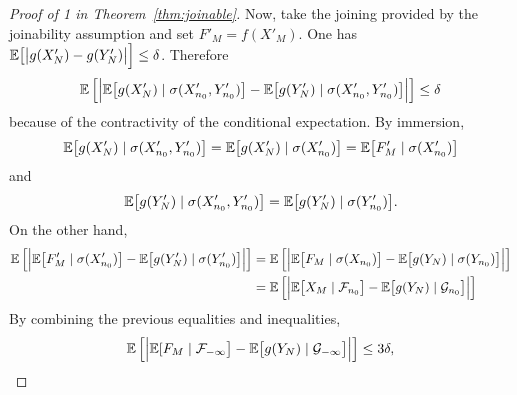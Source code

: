 \documentclass[12pt,a4paper]{article}
\begin{document}
\begin{proof}[Proof of 1 in Theorem~\ref{thm:joinable}]
Now, take the joining provided by the joinability assumption and set $F'_M=f(X'_M)$. 
One has $\mathbb{E}\bigl[\bigl|g(X'_N) - g(Y'_N)\bigr|\Bigr] \leq \delta$. Therefore 
$$
\mathbb{E}\left[ \Bigr|\mathbb{E}\bigl[g(X'_N) \mid \sigma(X'_{n_0}, Y'_{n_0})\bigr] 
 - \mathbb{E}\bigl[g(Y'_N) \mid \sigma(X'_{n_0}, Y'_{n_0}) \bigr] \Bigl| \right] \leq \delta
$$
because of the contractivity of the conditional expectation. 
By immersion, 
$$
\mathbb{E}\bigl[g(X'_N) \mid \sigma(X'_{n_0}, Y'_{n_0})\bigr] 
= \mathbb{E}\bigl[g(X'_N) \mid \sigma(X'_{n_0})\bigr] = \mathbb{E}\bigl[F'_M \mid \sigma(X'_{n_0})\bigr]
$$
and 
$$
\mathbb{E}\bigl[g(Y'_N) \mid \sigma(X'_{n_0}, Y'_{n_0})\bigr] 
= \mathbb{E}\bigl[g(Y'_N) \mid \sigma(Y'_{n_0})\bigr]. 
$$
On the other hand, 
\begin{align*}
\mathbb{E}\left[ \Bigr| 
\mathbb{E}\bigl[F'_M \mid \sigma(X'_{n_0})\bigr] 
 - \mathbb{E}\bigl[g(Y'_N) \mid \sigma(Y'_{n_0})\bigr] 
\Bigl| \right] 
& = \mathbb{E}\left[ \Bigr| 
\mathbb{E}\bigl[F_M \mid \sigma(X_{n_0})\bigr] 
 - \mathbb{E}\bigl[g(Y_N) \mid \sigma(Y_{n_0})\bigr] 
\Bigl| \right] \\
& = \mathbb{E}\left[ \Bigr| 
\mathbb{E}\bigl[X_M \mid \mathcal{F}_{n_0}\bigr] 
 - \mathbb{E}\bigl[g(Y_N) \mid \mathcal{G}_{n_0}\bigr] 
\Bigl| \right]
\end{align*}
By combining the previous equalities and inequalities, 
$$
\mathbb{E}\left[ \Bigr| 
\mathbb{E}[F_M \mid \mathcal{F}_{-\infty}\bigr]  -  \mathbb{E}\bigl[g(Y_N) \mid \mathcal{G}_{-\infty}\bigr]
\Bigl| \right] 
\leq 3\delta,
$$
%
%
%
%
%
%

\end{proof}
\end{document}
